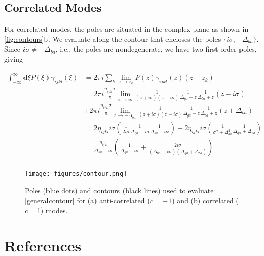 \documentclass[aip, jcp, reprint, onecolumn, nofootinbib]{revtex4-2}
\begin{document}
\subsection{Correlated Modes}
For correlated modes, the poles are situated in the complex plane as shown in \autoref{fig:contours}b.
We evaluate along the contour that encloses the poles $\{i\sigma, -\Delta_{ba}\}$.
Since $i\sigma \neq -\Delta_{ba}$, i.e., the poles are nondegenerate, we have two first order poles, giving
\begin{widetext}
	\begin{equation}
		\begin{split}
			\int_{-\infty}^\infty \mathrm{d}\xi P(\xi) \gamma_{ijkl}(\xi) &= 2\pi i \sum_k \lim_{z \rightarrow z_k} P(z) \gamma_{ijkl}(z) (z - z_k)\\
			&= 2\pi i \frac{\eta_{ijkl} \sigma}{\pi}  \lim_{z \rightarrow i\sigma} \frac{1}{(z + i\sigma)(z - i\sigma)} \frac{1}{\Delta_{ga} - z} \frac{1}{\Delta_{ba} + z} \left(z - i \sigma\right) \\ 
			&+ 2\pi i \frac{\eta_{ijkl} \sigma}{\pi} \lim_{z \rightarrow -\Delta_{ba}} \frac{1}{(z + i\sigma)(z - i\sigma)} \frac{1}{\Delta_{ga} - z} \frac{1}{\Delta_{ba} + z} \left(z + \Delta_{ba}\right)\\
			&= 2 \eta_{ijkl} i \sigma \left(\frac{1}{2 i \sigma} \frac{1}{\Delta_{ga} - i\sigma} \frac{1}{\Delta_{ba} + i\sigma} \right) + 2\eta_{ijkl} i \sigma \left(\frac{1}{\sigma^2 + \Delta_{ba} ^2} \frac{1}{\Delta_{ga} + \Delta_{ba}} \right)\\
			&= \frac{\eta_{ijkl}}{\Delta_{ba} + i \sigma} \left(\frac{1}{\Delta_{ga} - i \sigma} + \frac{2i\sigma}{(\Delta_{ba} - i \sigma)(\Delta_{ga} + \Delta_{ba})}\right)\\
		\end{split}
	\end{equation}
\end{widetext}


\begin{figure}[!htbp]
	\centering
	\texttt{[image: figures/contour.png]}
	\caption{Poles (blue dots) and contours (black lines) used to evaluate \autoref{generalcontour} for (a) anti-correlated ($c=-1$) and (b) correlated ($c=1$) modes. 
	} 
	\label{fig:contours}
\end{figure}

\section{References}

\end{document}

